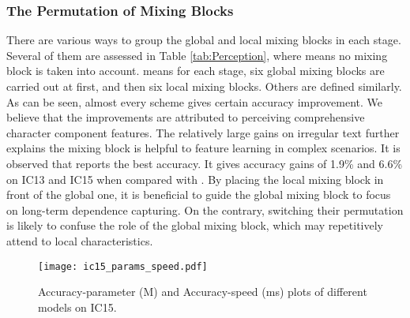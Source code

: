 \documentclass{article}
\begin{document}
\begin{table}[t]
\centering
{}

\caption{Ablation study on mixing block permutation.}
\label{tab:Perception}
\end{table}

\subsubsection{The Permutation of Mixing Blocks}
There are various ways to group the global and local mixing blocks in each stage. Several of them are assessed in Table \ref{tab:Perception}, where  means no mixing block is taken into account.  means for each stage, six global mixing blocks are carried out at first, and then six local mixing blocks. Others are defined similarly. As can be seen, almost every scheme gives certain accuracy improvement. We believe that the improvements are attributed to perceiving comprehensive character component features. The relatively large gains on irregular text further explains the mixing block is helpful to feature learning in complex scenarios. It is observed that  reports the best accuracy. It gives accuracy gains of 1.9\% and 6.6\% on IC13 and IC15 when compared with . By placing the local mixing block in front of the global one, it is beneficial to guide the global mixing block to focus on long-term dependence capturing. On the contrary, switching their permutation is likely to confuse the role of the global mixing block, which may repetitively attend to local characteristics.


\begin{figure}[t]  
\centering  
\texttt{[image: ic15\_params\_speed.pdf]}  
\caption{Accuracy-parameter (M) and Accuracy-speed (ms) plots of different models on IC15.}  
\label{fig:params_speed}  
\end{figure}
\end{document}
